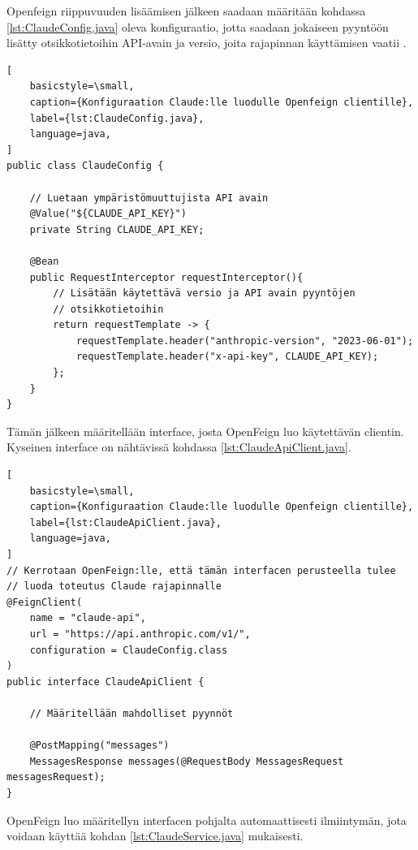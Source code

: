 Openfeign riippuvuuden lisäämisen jälkeen saadaan määritään kohdassa
\ref{lst:ClaudeConfig.java} oleva konfiguraatio, jotta saadaan jokaiseen
pyyntöön lisätty otsikkotietoihin API-avain ja versio, joita rajapinnan
käyttämisen vaatii \parencite{anthropicAPIDocsVersions}
\parencite{anthropicAPIDocsGettingStarted}.

\begin{lstlisting}[
    basicstyle=\small,
    caption={Konfiguraation Claude:lle luodulle Openfeign clientille},
    label={lst:ClaudeConfig.java},
    language=java,
]
public class ClaudeConfig {

    // Luetaan ympäristömuuttujista API avain
    @Value("${CLAUDE_API_KEY}")
    private String CLAUDE_API_KEY;

    @Bean
    public RequestInterceptor requestInterceptor(){
        // Lisätään käytettävä versio ja API avain pyyntöjen
        // otsikkotietoihin
        return requestTemplate -> {
            requestTemplate.header("anthropic-version", "2023-06-01");
            requestTemplate.header("x-api-key", CLAUDE_API_KEY);
        };
    }
}
\end{lstlisting}

Tämän jälkeen määritellään interface, josta OpenFeign luo käytettävän clientin.
Kyseinen interface on nähtävissä kohdassa \ref{lst:ClaudeApiClient.java}.

\begin{lstlisting}[
    basicstyle=\small,
    caption={Konfiguraation Claude:lle luodulle Openfeign clientille},
    label={lst:ClaudeApiClient.java},
    language=java,
]
// Kerrotaan OpenFeign:lle, että tämän interfacen perusteella tulee
// luoda toteutus Claude rajapinnalle
@FeignClient(
    name = "claude-api",
    url = "https://api.anthropic.com/v1/",
    configuration = ClaudeConfig.class
)
public interface ClaudeApiClient {

    // Määritellään mahdolliset pyynnöt

    @PostMapping("messages")
    MessagesResponse messages(@RequestBody MessagesRequest messagesRequest);
}
\end{lstlisting}

OpenFeign luo määritellyn interfacen pohjalta automaattisesti ilmiintymän, jota
voidaan käyttää kohdan \ref{lst:ClaudeService.java} mukaisesti.

